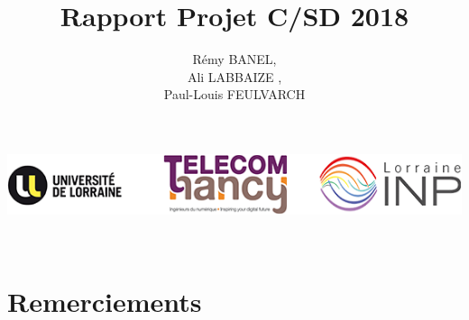 \documentclass[light]{ceri}
\title{Rapport Projet C/SD 2018}
\author{
  Rémy BANEL, \\
  Ali LABBAIZE , \\
  Paul-Louis FEULVARCH \\
}
\begin{document}


\begin{center} 

\maketitle

\includegraphics[width=1.0\textwidth]{images/logos.png}
\end{center}

\thispagestyle{empty}
\newpage
~
\thispagestyle{empty}
\newpage

\setcounter{page}{1}
\pagestyle{fancy}
\MyToc



\section*{Remerciements}
\end{document}
